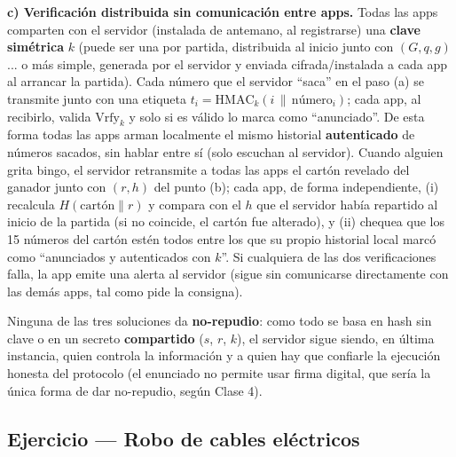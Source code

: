 \textbf{c) Verificación distribuida sin comunicación entre apps.} Todas las apps
comparten con el servidor (instalada de antemano, al registrarse) una \textbf{clave
simétrica} $k$ (puede ser una por partida, distribuida al inicio junto con $(G,q,g)$... o
más simple, generada por el servidor y enviada cifrada/instalada a cada app al arrancar la
partida). Cada número que el servidor ``saca'' en el paso (a) se transmite junto con una
etiqueta $t_i=\mathrm{HMAC}_k(i\,\|\,\text{número}_i)$; cada app, al recibirlo, valida
$\mathrm{Vrfy}_k$ y solo si es válido lo marca como ``anunciado''. De esta forma todas las
apps arman localmente el mismo historial \textbf{autenticado} de números sacados, sin
hablar entre sí (solo escuchan al servidor). Cuando alguien grita bingo, el servidor
retransmite a todas las apps el cartón revelado del ganador junto con $(r,h)$ del punto
(b); cada app, de forma independiente, (i) recalcula $H(\text{cartón}\|r)$ y compara con el
$h$ que el servidor había repartido al inicio de la partida (si no coincide, el cartón fue
alterado), y (ii) chequea que los 15 números del cartón estén todos entre los que su propio
historial local marcó como ``anunciados y autenticados con $k$''. Si cualquiera de las dos
verificaciones falla, la app emite una alerta al servidor (sigue sin comunicarse
directamente con las demás apps, tal como pide la consigna).

\begin{ojo}
Ninguna de las tres soluciones da \textbf{no-repudio}: como todo se basa en hash sin clave
o en un secreto \textbf{compartido} ($s$, $r$, $k$), el servidor sigue siendo, en última
instancia, quien controla la información y a quien hay que confiarle la ejecución honesta
del protocolo (el enunciado no permite usar firma digital, que sería la única forma de dar
no-repudio, según Clase 4).
\end{ojo}

\subsection{Ejercicio --- Robo de cables eléctricos}

